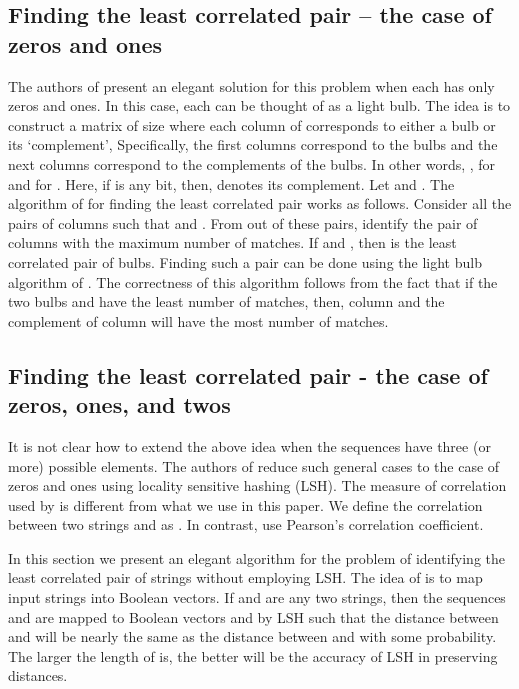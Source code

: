 \documentclass{article}
\theoremstyle{definition}
\theoremstyle{remark}
\begin{document}
\subsection{Finding the least correlated pair -- the case of zeros and ones}
 The authors of \cite{PBK11} present an elegant solution for this problem when each  has only zeros and ones. In this case, each  can be thought of as a light bulb. The idea is to construct a matrix  of size  where each column of  corresponds to either a bulb or its `complement', Specifically, the first  columns correspond to the bulbs and the next  columns correspond to the complements of the bulbs. In other words, , for  and  for . Here, if  is any bit, then,  denotes its complement. Let  and . The algorithm of \cite{PBK11} for finding the least correlated pair works as follows. Consider all the pairs of columns  such that  and . From out of these pairs, identify the pair  of columns with the maximum number of matches.  If  and , then  is the least correlated pair of bulbs. Finding such a pair  can be done using the light bulb algorithm of \cite{RSJ89}. The correctness of this algorithm follows from the fact that if the two bulbs  and  have the least number of matches, then, column  and the complement of column  will have the most number of matches.

\subsection{Finding the least correlated pair - the case of zeros, ones, and twos}\label{mapping}
 It is not clear how to extend the above idea when the sequences have three (or more) possible elements. The authors of \cite{PBK11} reduce such general cases to the case of zeros and ones using locality sensitive hashing (LSH).
 The measure of correlation used by \cite{PBK11} is different from what we use in this paper. We define the correlation between two strings  and  as . In contrast, \cite{PBK11} use Pearson's correlation coefficient.



 In this section we present an elegant algorithm for the problem of identifying the least correlated pair of strings without employing LSH. The idea of \cite{PBK11} is to map input strings into Boolean vectors. If  and  are any two strings, then the sequences  and  are mapped to Boolean vectors  and  by LSH such that the distance between  and  will be nearly the same as the distance between  and  with some probability. The larger the length of  is, the better will be the accuracy of LSH in preserving distances.
\end{document}
